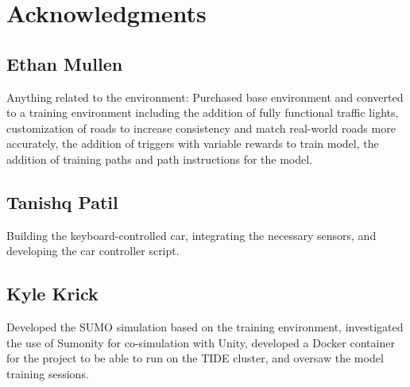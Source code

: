 \documentclass[conference]{IEEEtran}
\begin{document}
\section{Acknowledgments}
\subsection{Ethan Mullen}
Anything related to the environment: Purchased base environment and converted to a training environment including the addition of fully functional traffic lights, customization of roads to increase consistency and match real-world roads more accurately, the addition of triggers with variable rewards to train model, the addition of training paths and path instructions for the model.
\subsection{Tanishq Patil}
Building the keyboard-controlled car, integrating the necessary sensors, and developing the car controller script.
\subsection{Kyle Krick}
Developed the SUMO simulation based on the training environment, investigated the use of Sumonity  for co-simulation with Unity, developed a Docker container for the project to be able to run on the TIDE cluster, and oversaw the model training sessions.



\end{document}
